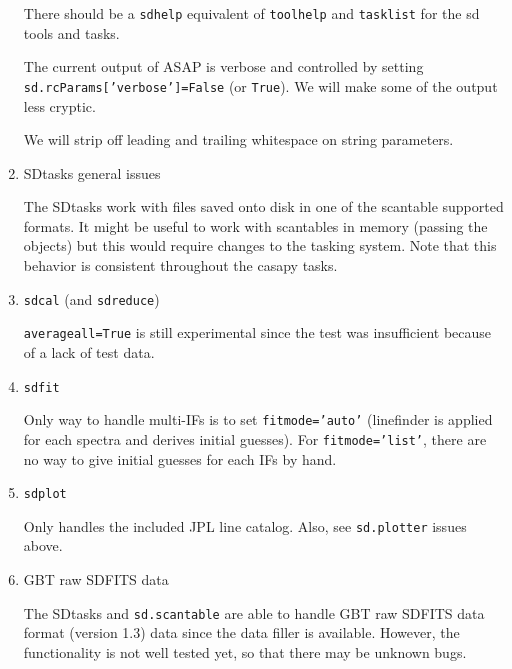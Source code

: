 \begin{enumerate}
  There should be a {\tt sdhelp} equivalent of {\tt toolhelp}
  and {\tt tasklist} for the sd tools and tasks.

  The current output of ASAP is verbose and controlled by
  setting {\tt sd.rcParams['verbose']=False} (or {\tt True}).
  We will make some of the output less cryptic.

  We will strip off leading and trailing whitespace on string parameters.

\item SDtasks general issues

  The SDtasks work with files saved onto disk in one of the 
  scantable supported formats.  It might be useful to
  work with scantables in memory (passing the objects) but this
  would require changes to the tasking system.  Note that this
  behavior is consistent throughout the casapy tasks.


\item {\tt sdcal} (and {\tt sdreduce})

  {\tt averageall=True} is still experimental since the test was insufficient 
  because of a lack of test data.

% 

\item {\tt sdfit}

%
Only way to handle multi-IFs is to set {\tt fitmode='auto'}
(linefinder is applied for each spectra and derives initial guesses).
For {\tt fitmode='list'}, there are no way to give initial guesses for each IFs by hand.

\item {\tt sdplot}

  Only handles the included JPL line catalog.  Also, see {\tt sd.plotter} issues above.

\item GBT raw SDFITS data

  The SDtasks and {\tt sd.scantable} are able to handle GBT raw SDFITS data format (version 1.3) data 
  since the data filler is available. However, the functionality is not well 
  tested yet, so that there may be unknown bugs.  

%

\end{enumerate}

